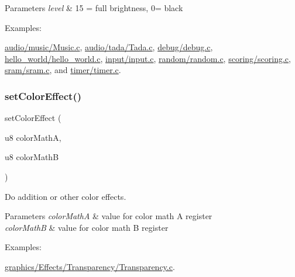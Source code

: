 \begin{DoxyParams}{Parameters}
{\em level} & 15 = full brightness, 0= black \\
\hline
\end{DoxyParams}
\begin{Desc}
\item[Examples\+: ]\par
\hyperlink{a00485}{audio/music/\+Music.\+c}, \hyperlink{a00487}{audio/tada/\+Tada.\+c}, \hyperlink{a00489}{debug/debug.\+c}, \hyperlink{a00451}{hello\+\_\+world/hello\+\_\+world.\+c}, \hyperlink{a00479}{input/input.\+c}, \hyperlink{a00491}{random/random.\+c}, \hyperlink{a00495}{scoring/scoring.\+c}, \hyperlink{a00493}{sram/sram.\+c}, and \hyperlink{a00481}{timer/timer.\+c}.\end{Desc}
\mbox{\label{a00416_a87d6cb8ec2433c908666a0a7f2306cb4}} 
\subsubsection{\texorpdfstring{set\+Color\+Effect()}{setColorEffect()}}
{\footnotesize\ttfamily set\+Color\+Effect (\begin{DoxyParamCaption}\item[{u8}]{color\+MathA,  }\item[{u8}]{color\+MathB }\end{DoxyParamCaption})}



Do addition or other color effects. 


\begin{DoxyParams}{Parameters}
{\em color\+MathA} & value for color math A register \\
\hline
{\em color\+MathB} & value for color math B register \\
\hline
\end{DoxyParams}
\begin{Desc}
\item[Examples\+: ]\par
\hyperlink{a00471}{graphics/\+Effects/\+Transparency/\+Transparency.\+c}.\end{Desc}
\mbox{\label{a00416_aedc79f1675778d0573d181fe22a0902d}} 
